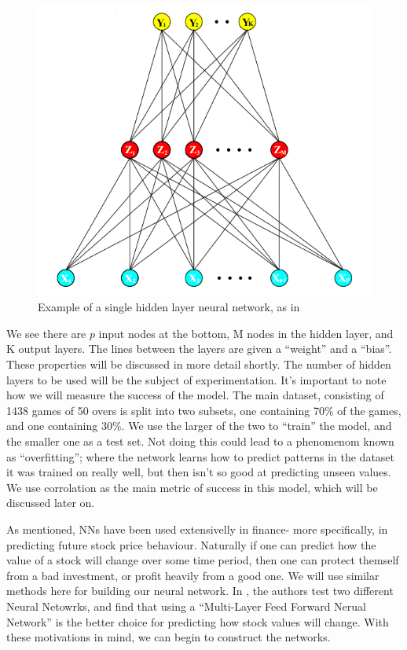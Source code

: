 \begin{figure}
    \centering
    \includegraphics[scale=0.5]{figures/nn.png}
    \caption{Example of a single hidden layer neural network, as in \cite{sprbk}}
    \label{nnexample1}
\end{figure}

We see there are $p$ input nodes at the bottom, M nodes in the hidden layer, and K output layers. The lines between the layers are given a ``weight''
and a ``bias''. These properties will be discussed in more detail shortly. The number of hidden layers to be used will be the subject of experimentation. 
It's important to note how we will measure the success of the model. The main dataset, consisting of 1438 games of 50 overs is split into two subsets, one 
containing 70\% of the games, and one containing 30\%. We use the larger of the two to ``train'' the model, and the smaller one as a test set. Not doing this could 
lead to a phenomenom known as ``overfitting''; where the network learns how to predict patterns in the dataset it was trained on really well, but then isn't so good 
at predicting unseen values. We use corrolation as the main metric of success in this model, which will be discussed later on.

As mentioned, NNs have been used extensivelly in finance- more specifically, in predicting future stock price behaviour. Naturally if one can predict how the value of a stock
will change over some time period, then one can protect themself from a bad investment, or profit heavily from a good one. We will use similar
methods here for building our neural network.  In \cite{nnstock}, the authors test two different Neural Netowrks, and find that using a ``Multi-Layer Feed Forward Nerual Network''
is the better choice for predicting how stock values will change. With these motivations in mind, we can begin to construct the networks.

